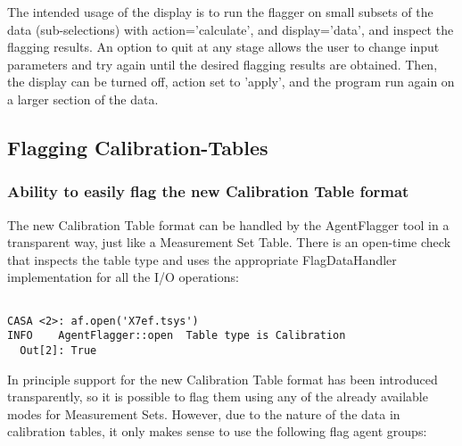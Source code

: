 The intended usage of the display is to run the flagger on small subsets of the data (sub-selections)
with action='calculate', and display='data', and inspect the flagging results. 
An option to quit at any stage allows the user to change input parameters and try again until the
desired flagging results are obtained.  Then, the display can be turned off,
action set to 'apply', and the program run again on a larger section of the
data.


\subsection{Flagging Calibration-Tables}

\subsubsection{Ability to easily flag the new Calibration Table format}

The new Calibration Table format can be handled by the AgentFlagger tool in a
transparent way, just like a Measurement Set Table. There is an open-time check
that inspects the table type and uses the appropriate FlagDataHandler
implementation for all the I/O operations:

\begin{verbatim}

CASA <2>: af.open('X7ef.tsys')
INFO	AgentFlagger::open	Table type is Calibration
  Out[2]: True

\end{verbatim}

In principle support for the new Calibration Table format has been introduced
transparently, so it is possible to flag them using any of the already available
modes for Measurement Sets. However, due to the nature of the data in
calibration tables, it only makes sense to use the following flag agent groups:

